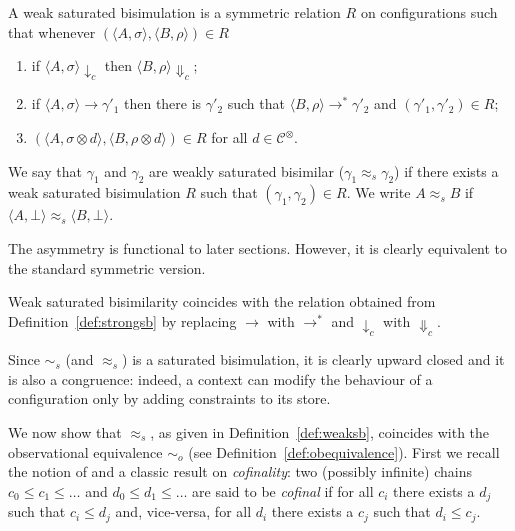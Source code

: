 \documentclass{llncs}
\begin{document}
\begin{definition}\label{def:weaksb} A weak saturated bisimulation is a symmetric relation $R$ on configurations such that whenever
$( \langle A, \sigma \rangle,\langle B, \rho \rangle) \in R$
\begin{enumerate}
\item if $\langle A, \sigma \rangle \downarrow_c$ then $\langle B, \rho \rangle \Downarrow_c$;
\item if $\langle A, \sigma \rangle \longrightarrow \gamma'_1$ then there is $\gamma'_2$ such that $\langle B, \rho \rangle \longrightarrow^* \gamma'_2$ and $(\gamma'_1, \gamma'_2) \in R$;
\item $(\langle A,\sigma \otimes d\rangle, \langle B,\rho \otimes d \rangle) \in R$ for  all $d \in \mathcal{C}^\otimes$.
\end{enumerate}
We say that $\gamma_1$ and $\gamma_2$ are  weakly saturated bisimilar ($\gamma_1  \approx_{\mathit{s}} \gamma_2$) if there exists a  
weak saturated  bisimulation $R$ such that $(\gamma_1 , \gamma_2 ) \in R$. 
We write $A \approx_{\mathit{s}} B$ if $\langle A, \bot\rangle \approx_{\mathit{s}} \langle B, \bot \rangle$.
\end{definition}

The asymmetry is functional to later sections. However, it is clearly equivalent to the standard symmetric version.

\begin{definition}\label{def:weaksb2}
Weak saturated bisimilarity coincides with the relation 
obtained from Definition~\ref{def:strongsb} by replacing $\longrightarrow$ with $\longrightarrow^*$ and $\downarrow_c$ with $\Downarrow_c$.
\end{definition}

Since $\sim_{\mathit{s}}$ (and $\approx_{\mathit{s}}$) is a saturated bisimulation, it is clearly upward closed and it is also a congruence: indeed, a context can modify the behaviour of a configuration only by adding constraints to its store.

\medskip
We now show that $\approx_{\mathit{s}}$, as given in Definition~\ref{def:weaksb}, coincides with the observational equivalence $\sim_o$ (see Definition~\ref{def:obequivalence}). First we recall the notion of and a classic result on \emph{cofinality}: two (possibly infinite) chains $c_0 \leq c_1 \leq \dots$ and  $d_0 \leq d_1 \leq \dots$ are said to be \emph{cofinal} if for all $c_i$ there exists a $d_j$ such that $c_i \leq d_j$ and, vice-versa, for all $d_i$ there exists a $c_j$ such that $d_i \leq c_j$.
\end{document}
